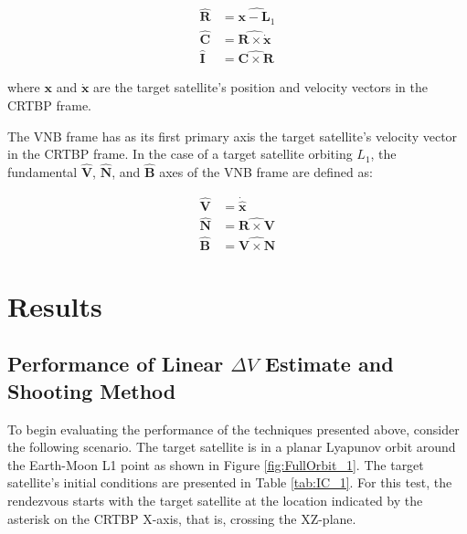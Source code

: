 \documentclass[a4paper]{article}
\begin{document}
\begin{equation*} \label{eq:RIC}
\begin{aligned}
\mathbf{\hat{R}} &= \widehat{\mathbf{x} - \mathbf{L}_1} \\
\mathbf{\hat{C}} &= \widehat{\mathbf{R} \times \mathbf{\dot{x}}} \\
\mathbf{\hat{I}} \, &= \widehat{\mathbf{C} \times \mathbf{R}}
\end{aligned}
\end{equation*}

where \(\mathbf{x}\) and \(\mathbf{\dot{x}}\) are the target satellite's position and velocity vectors in the CRTBP frame.

The VNB frame has as its first primary axis the target satellite's velocity vector in the CRTBP frame.  In the case of a target satellite orbiting \(L_1\), the fundamental \(\mathbf{\hat{V}}\), \(\mathbf{\hat{N}}\), and \(\mathbf{\hat{B}}\) axes of the VNB frame are defined as:

\begin{equation*} \label{eq:VNB}
\begin{aligned}
\mathbf{\hat{V}} &= \mathbf{\dot{\hat{x}}} \\
\mathbf{\hat{N}} &= \widehat{\mathbf{R} \times \mathbf{V}}  \\
\mathbf{\hat{B}} &= \widehat{\mathbf{V} \times \mathbf{N}} 
\end{aligned}
\end{equation*}

\section{Results}

\subsection{Performance of Linear \(\Delta V\) Estimate and Shooting Method}

To begin evaluating the performance of the techniques presented above, consider the following scenario.  The target satellite is in a planar Lyapunov orbit around the Earth-Moon L1 point as shown in Figure \ref{fig:FullOrbit_1}.  The target satellite's initial conditions are presented in Table \ref{tab:IC_1}.  For this test, the rendezvous starts with the target satellite at the location indicated by the asterisk on the CRTBP X-axis, that is, crossing the XZ-plane.
\end{document}
